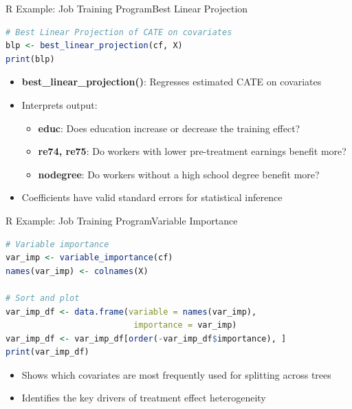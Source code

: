 \documentclass[dvipsnames,hyperref={pdfpagelabels=false}]{beamer}
\begin{document}
\begin{frame}[fragile]{R Example: Job Training Program}{Best Linear Projection}
\begin{lstlisting}[language=R]
# Best Linear Projection of CATE on covariates
blp <- best_linear_projection(cf, X)
print(blp)
\end{lstlisting}
	\begin{itemize}
		\item \textbf{best\_linear\_projection()}: Regresses estimated CATE on covariates
		\vspace{0.3cm}
		\item Interprets output:
		\vspace{0.2cm}
		\begin{itemize}
			\item \textbf{educ}: Does education increase or decrease the training effect?
			\vspace{0.2cm}
			\item \textbf{re74, re75}: Do workers with lower pre-treatment earnings benefit more?
			\vspace{0.2cm}
			\item \textbf{nodegree}: Do workers without a high school degree benefit more?
		\end{itemize}
		\vspace{0.3cm}
		\item Coefficients have valid standard errors for statistical inference
	\end{itemize}
\end{frame}




\begin{frame}[fragile]{R Example: Job Training Program}{Variable Importance}
\begin{lstlisting}[language=R]
# Variable importance
var_imp <- variable_importance(cf)
names(var_imp) <- colnames(X)

# Sort and plot
var_imp_df <- data.frame(variable = names(var_imp),
                          importance = var_imp)
var_imp_df <- var_imp_df[order(-var_imp_df$importance), ]
print(var_imp_df)
\end{lstlisting}
	\begin{itemize}
		\item Shows which covariates are most frequently used for splitting across trees
		\vspace{0.2cm}
		\item Identifies the key drivers of treatment effect heterogeneity
	\end{itemize}
\end{frame}
\end{document}
